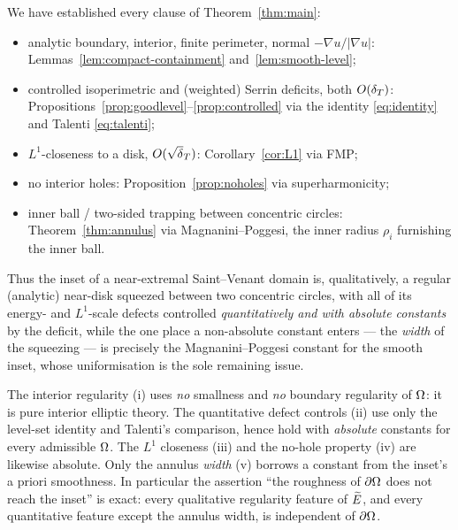 We have established every clause of Theorem~\ref{thm:main}:
\begin{itemize}[leftmargin=1.6em]
\item[(i)] analytic boundary, interior, finite perimeter, normal
$-\nabla u/|\nabla u|$: Lemmas~\ref{lem:compact-containment}
and~\ref{lem:smooth-level};
\item[(ii)] controlled isoperimetric and (weighted) Serrin deficits, both
$O(\delta_T)$: Propositions~\ref{prop:goodlevel}--\ref{prop:controlled} via the
identity \eqref{eq:identity} and Talenti \eqref{eq:talenti};
\item[(iii)] $L^1$-closeness to a disk, $O(\sqrt\dT)$: Corollary~\ref{cor:L1}
via FMP;
\item[(iv)] no interior holes: Proposition~\ref{prop:noholes} via
superharmonicity;
\item[(v)] inner ball / two-sided trapping between concentric circles:
Theorem~\ref{thm:annulus} via Magnanini--Poggesi, the inner radius
$\rho_i$ furnishing the inner ball.
\end{itemize}
Thus the inset of a near-extremal Saint--Venant domain is, qualitatively, a
regular (analytic) near-disk squeezed between two concentric circles, with
all of its energy- and $L^1$-scale defects controlled \emph{quantitatively
and with absolute constants} by the deficit, while the one place a
non-absolute constant enters --- the \emph{width} of the squeezing --- is
precisely the Magnanini--Poggesi constant for the smooth inset, whose
uniformisation is the sole remaining issue.

\begin{remark}\label{rem:audit}
The interior regularity (i) uses \emph{no} smallness and \emph{no} boundary
regularity of $\Omega$: it is pure interior elliptic theory. The
quantitative defect controls (ii) use only the level-set identity and
Talenti's comparison, hence hold with \emph{absolute} constants for every
admissible $\Omega$. The $L^1$ closeness (iii) and the no-hole property (iv)
are likewise absolute. Only the annulus \emph{width} (v) borrows a constant
from the inset's a priori smoothness. In particular the assertion ``the
roughness of $\partial\Omega$ does not reach the inset'' is exact: every
qualitative regularity feature of $\widetilde E$, and every quantitative feature
except the annulus width, is independent of $\partial\Omega$.
\end{remark}
